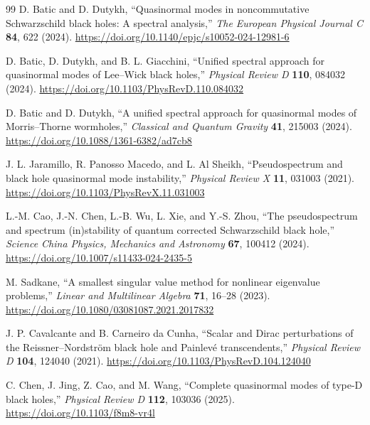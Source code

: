 \documentclass[12pt,a4paper]{article}
\begin{document}
\begin{thebibliography}{99}
D. Batic and D. Dutykh,
``Quasinormal modes in noncommutative Schwarzschild black holes: A spectral analysis,''
\emph{The European Physical Journal C} \textbf{84}, 622 (2024).
\url{https://doi.org/10.1140/epjc/s10052-024-12981-6}

D. Batic, D. Dutykh, and B. L. Giacchini,
``Unified spectral approach for quasinormal modes of Lee--Wick black holes,''
\emph{Physical Review D} \textbf{110}, 084032 (2024).
\url{https://doi.org/10.1103/PhysRevD.110.084032}

D. Batic and D. Dutykh,
``A unified spectral approach for quasinormal modes of Morris--Thorne wormholes,''
\emph{Classical and Quantum Gravity} \textbf{41}, 215003 (2024).
\url{https://doi.org/10.1088/1361-6382/ad7cb8}

J. L. Jaramillo, R. Panosso Macedo, and L. Al Sheikh,
``Pseudospectrum and black hole quasinormal mode instability,''
\emph{Physical Review X} \textbf{11}, 031003 (2021).
\url{https://doi.org/10.1103/PhysRevX.11.031003}

L.-M. Cao, J.-N. Chen, L.-B. Wu, L. Xie, and Y.-S. Zhou,
``The pseudospectrum and spectrum (in)stability of quantum corrected Schwarzschild black hole,''
\emph{Science China Physics, Mechanics and Astronomy} \textbf{67}, 100412 (2024).
\url{https://doi.org/10.1007/s11433-024-2435-5}

M. Sadkane,
``A smallest singular value method for nonlinear eigenvalue problems,''
\emph{Linear and Multilinear Algebra} \textbf{71}, 16--28 (2023).
\url{https://doi.org/10.1080/03081087.2021.2017832}

\color{blue}
J. P. Cavalcante and B. Carneiro da Cunha,
``Scalar and Dirac perturbations of the Reissner--Nordstr\"om black hole and Painlev\'e transcendents,''
\emph{Physical Review D} \textbf{104}, 124040 (2021).
\url{https://doi.org/10.1103/PhysRevD.104.124040}

C. Chen, J. Jing, Z. Cao, and M. Wang,
``Complete quasinormal modes of type-D black holes,''
\emph{Physical Review D} \textbf{112}, 103036 (2025).
\url{https://doi.org/10.1103/f8m8-vr4l}

\color{black}
\end{thebibliography}
\end{document}
